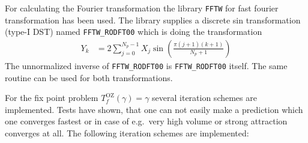 For calculating the Fourier transformation the library \texttt{FFTW} for fast fourier transformation
\cite{FFTW05,FFTW97} has been used. The library supplies a discrete sin transformation (type-I DST)
named \verb"FFTW_RODFT00" which is doing the transformation
\begin{align}
Y_k &= 2 \sum_{j=0}^{N_p-1} X_j \sin\left(\frac{\pi(j + 1)(k + 1)}{N_p + 1}\right)
\end{align}
The unnormalized inverse of \verb"FFTW_RODFT00" is \verb"FFTW_RODFT00" itself.
The same routine can be used for both transformations.

For the fix point problem $T^\mathrm{OZ}_f(\gamma)=\gamma$ several iteration schemes are implemented. Tests have shown, that one can not easily make a prediction which one converges fastest or in case of e.g.\ very high volume or strong attraction converges at all. The following iteration schemes are implemented:

